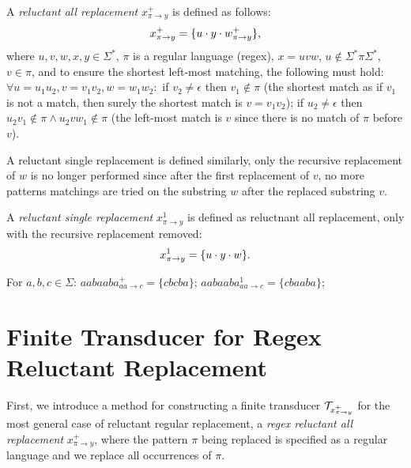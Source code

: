 
\begin{definition} \hfill \newline
  A \emph{reluctant all replacement} $x^{+}_{\pi \rightarrow y}$ is defined as follows: \newline
  $$x^{+}_{\pi \rightarrow y} = \{ u \cdot y \cdot w^{+}_{\pi \rightarrow y} \} \text{,}$$
  where $u, v, w, x, y \in \Sigma^*$, $\pi$ is a regular language (regex), $x = u v w$, $u \notin \Sigma^* \pi \Sigma^*$, $v \in \pi$, and to ensure the shortest left-most matching, the following must hold: $\forall u = u_1 u_2, v = v_1 v_2, w = w_1 w_2:$ if $v_2 \neq \epsilon$ then $v_1 \notin \pi$ (the shortest match as if $v_1$ is not a match, then surely the  shortest match is $v = v_1v_2$); if $u_2 \neq \epsilon$ then $u_2 v_1 \notin \pi \land u_2 v w_1 \notin \pi$ (the left-most match is $v$ since there is no match of $\pi$ before $v$).
\end{definition}

A reluctant single replacement is defined similarly, only the recursive replacement of $w$ is no longer performed since after the first replacement of $v$, no more patterns matchings are tried on the substring $w$ after the replaced substring $v$.
\begin{definition} \hfill \newline
  A \emph{reluctant single replacement} $x^{1}_{\pi \rightarrow y}$ is defined as reluctnant all replacement, only with the recursive replacement removed:
  $$x^{1}_{\pi \rightarrow y} = \{ u \cdot y \cdot w \} \text{.}$$
\end{definition}

\begin{example}
  For $a, b, c \in \Sigma$: $aabaaba^{+}_{aa \rightarrow c} = \{ cbcba \}$; $aabaaba^{1}_{aa \rightarrow c} = \{ cbaaba \}$;
\end{example}

\section{Finite Transducer for Regex Reluctant Replacement}

First, we introduce a method for constructing a finite transducer $\mathcal{T}_{x^{+}_{\pi \rightarrow y}}$ for the most general case of reluctant regular replacement, a \emph{regex reluctant all replacement} $x^{+}_{\pi \rightarrow y}$, where the pattern $\pi$ being replaced is specified as a regular language and we replace all occurrences of $\pi$.

